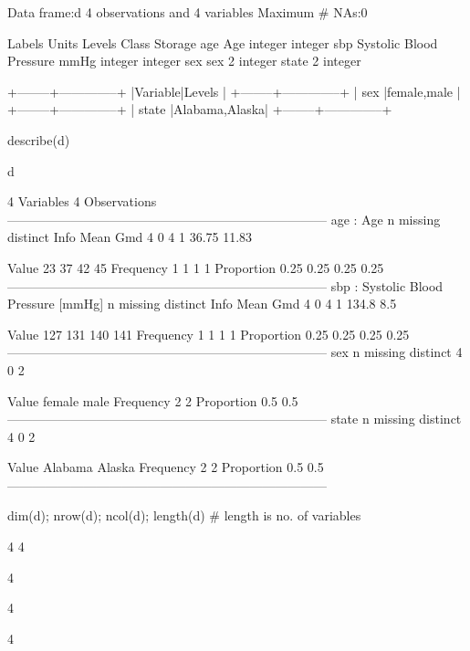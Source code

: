 \begin{Schunk}
\begin{Soutput}
Data frame:d	4 observations and 4 variables    Maximum # NAs:0


                       Labels Units Levels   Class Storage
age                       Age              integer integer
sbp   Systolic Blood Pressure  mmHg        integer integer
sex                       sex            2         integer
state                                    2         integer

+--------+--------------+
|Variable|Levels        |
+--------+--------------+
|  sex   |female,male   |
+--------+--------------+
|  state |Alabama,Alaska|
+--------+--------------+
\end{Soutput}
\begin{Sinput}
describe(d)
\end{Sinput}
\begin{Soutput}
d 

 4  Variables      4  Observations
---------------------------------------------------------------------------
age : Age 
       n  missing distinct     Info     Mean      Gmd 
       4        0        4        1    36.75    11.83 
                              
Value        23   37   42   45
Frequency     1    1    1    1
Proportion 0.25 0.25 0.25 0.25
---------------------------------------------------------------------------
sbp : Systolic Blood Pressure [mmHg] 
       n  missing distinct     Info     Mean      Gmd 
       4        0        4        1    134.8      8.5 
                              
Value       127  131  140  141
Frequency     1    1    1    1
Proportion 0.25 0.25 0.25 0.25
---------------------------------------------------------------------------
sex 
       n  missing distinct 
       4        0        2 
                        
Value      female   male
Frequency       2      2
Proportion    0.5    0.5
---------------------------------------------------------------------------
state 
       n  missing distinct 
       4        0        2 
                          
Value      Alabama  Alaska
Frequency        2       2
Proportion     0.5     0.5
---------------------------------------------------------------------------
\end{Soutput}
\begin{Sinput}
dim(d); nrow(d); ncol(d); length(d)  # length is no. of variables
\end{Sinput}
\begin{Soutput}
[1] 4 4
\end{Soutput}
\begin{Soutput}
[1] 4
\end{Soutput}
\begin{Soutput}
[1] 4
\end{Soutput}
\begin{Soutput}
[1] 4
\end{Soutput}
\end{Schunk}


